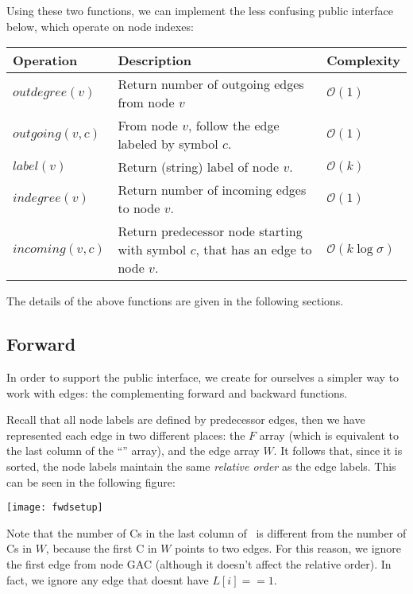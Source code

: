 Using these two functions, we can implement the less confusing public interface below, which operate on node indexes:

\begin{center}
\small
\begin{tabularx}{\textwidth}{@{}lXl@{}}
\toprule  
{\bf Operation} & {\bf Description} & {\bf Complexity}\\
\midrule  
$\textit{outdegree}(v)$ & Return number of outgoing edges from node $v$ & $\mathcal{O}(1)$\\
$\textit{outgoing}(v,c)$ & From node $v$, follow the edge labeled by symbol $c$. & $\mathcal{O}(1)$\\	
$\textit{label}(v)$ & Return (string) label of node $v$. & $\mathcal{O}(k)$\\
$\textit{indegree}(v)$ & Return number of incoming edges to node $v$. & $\mathcal{O}(1)$\\
$\textit{incoming}(v,c)$ & Return predecessor node starting with symbol $c$, that has an edge to node $v$. & $\mathcal{O}(k\log\sigma)$\\
\bottomrule
\end{tabularx}
\end{center}

The details of the above functions are given in the following sections.

\subsection{Forward}\label{bl-sec:fwd}

In order to support the public interface, we create for ourselves a simpler way to work with edges: the complementing forward and backward functions.

Recall that all node labels are defined by predecessor edges, then we have represented each edge in two different places: the $F$ array (which is equivalent to the last column of the ``\Node'' array), and the edge array $W$. It follows that, since it is sorted, the node labels maintain the same \emph{relative order} as the edge labels. This can be seen in the following figure:

\medskip\centerline{\texttt{[image: fwdsetup]}}\medskip

Note that the number of Cs in the last column of \Node\ is different from the number of Cs in $W$, because the first C in $W$ points to two edges. For this reason, we ignore the first edge from node GAC (although it doesn't affect the relative order). In fact, we ignore any edge that doesnt have $L[i] == 1$.

